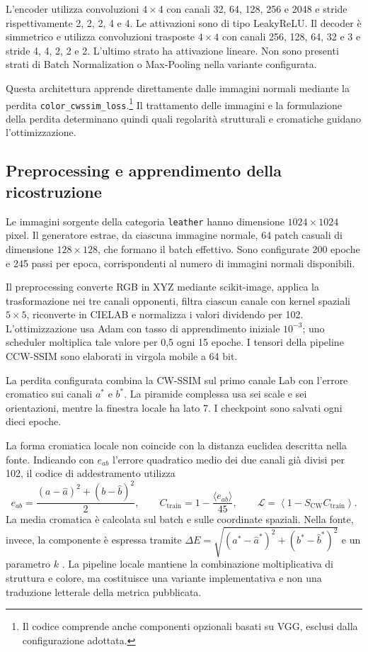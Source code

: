 L'encoder utilizza convoluzioni $4\times4$ con canali 32, 64, 128, 256 e 2048 e stride rispettivamente 2, 2, 2, 4 e 4. Le attivazioni sono di tipo LeakyReLU. Il decoder è simmetrico e utilizza convoluzioni trasposte $4\times4$ con canali 256, 128, 64, 32 e 3 e stride 4, 4, 2, 2 e 2. L'ultimo strato ha attivazione lineare. Non sono presenti strati di Batch Normalization o Max-Pooling nella variante configurata.

Questa architettura apprende direttamente dalle immagini normali mediante la perdita \texttt{color\_cwssim\_loss}.\footnote{Il codice comprende anche componenti opzionali basati su VGG, esclusi dalla configurazione adottata.} Il trattamento delle immagini e la formulazione della perdita determinano quindi quali regolarità strutturali e cromatiche guidano l’ottimizzazione.

\subsection{Preprocessing e apprendimento della ricostruzione}

Le immagini sorgente della categoria \texttt{leather} hanno dimensione $1024\times1024$ pixel. Il generatore estrae, da ciascuna immagine normale, 64 patch casuali di dimensione $128\times128$, che formano il batch effettivo. Sono configurate 200 epoche e 245 passi per epoca, corrispondenti al numero di immagini normali disponibili.

Il preprocessing converte RGB in XYZ mediante scikit-image, applica la trasformazione nei tre canali opponenti, filtra ciascun canale con kernel spaziali $5\times5$, riconverte in CIELAB e normalizza i valori dividendo per 102. L'ottimizzazione usa Adam con tasso di apprendimento iniziale $10^{-3}$; uno scheduler moltiplica tale valore per 0,5 ogni 15 epoche. I tensori della pipeline CCW-SSIM sono elaborati in virgola mobile a 64 bit.

La perdita configurata combina la CW-SSIM sul primo canale Lab con l'errore cromatico sui canali $a^*$ e $b^*$. La piramide complessa usa sei scale e sei orientazioni, mentre la finestra locale ha lato 7. I checkpoint sono salvati ogni dieci epoche.

La forma cromatica locale non coincide con la distanza euclidea descritta nella fonte. Indicando con $e_{ab}$ l'errore quadratico medio dei due canali già divisi per 102, il codice di addestramento utilizza
\begin{equation}
 e_{ab}=\frac{(a-\widehat a)^2+(b-\widehat b)^2}{2},\qquad
 C_{\mathrm{train}}=1-\frac{\langle e_{ab}\rangle}{45},\qquad
 \mathcal L=\left\langle 1-S_{\mathrm{CW}}C_{\mathrm{train}}\right\rangle.
\end{equation}
La media cromatica è calcolata sul batch e sulle coordinate spaziali. Nella fonte, invece, la componente è espressa tramite $\Delta E=\sqrt{(a^*-\widehat a^*)^2+(b^*-\widehat b^*)^2}$ e un parametro $k$ \cite{Berasi_2023}. La pipeline locale mantiene la combinazione moltiplicativa di struttura e colore, ma costituisce una variante implementativa e non una traduzione letterale della metrica pubblicata.

